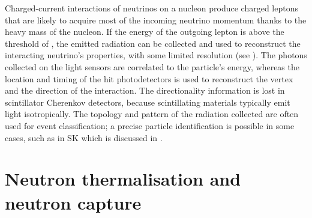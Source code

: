 Charged-current interactions of neutrinos on a nucleon produce charged leptons %
that are likely to acquire most of the incoming neutrino momentum thanks to the heavy mass of the nucleon.
If the energy of the outgoing lepton is above the threshold of , %
the emitted radiation can be collected and used to reconstruct the interacting neutrino's properties, %
with some limited resolution (see ).
The photons collected on the light sensors are correlated to the particle's energy, %
whereas the location and timing of the hit photodetectors is used to reconstruct the vertex %
and the direction of the interaction.
The directionality information is lost in scintillator Cherenkov detectors, because %
scintillating materials typically emit light isotropically.
The topology and pattern of the radiation collected are often used for event classification; %
a precise particle identification is possible in some cases, such as in SK which is discussed in .




\section{Neutron thermalisation and neutron capture}
\label{sec:neutron}

